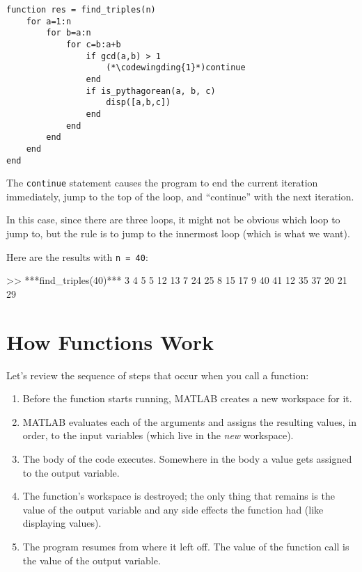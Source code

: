 \begin{lstlisting}[caption={Our final Pythagorean triples function}, label={lst:triples_function}] 
function res = find_triples(n)
    for a=1:n
        for b=a:n
            for c=b:a+b
                if gcd(a,b) > 1
	                (*\codewingding{1}*)continue
                end
                if is_pythagorean(a, b, c)
                    disp([a,b,c])
                end
            end
        end
    end
end
\end{lstlisting}

The \lstinline{continue} statement  causes the program to end the current iteration
immediately, jump to the top of the loop, and ``continue'' with the next iteration.

In this case, since there are three loops, it might not be obvious which loop to jump to, but the rule is to jump to the innermost loop (which is what we want).

Here are the results with \lstinline{n = 40}:

\begin{code}
>> ***find_triples(40)***
     3     4     5
     5    12    13
     7    24    25
     8    15    17
     9    40    41
    12    35    37
    20    21    29
\end{code}


\section{How Functions Work}

Let's review the sequence of steps that occur when you call a function:

\begin{enumerate}

\item Before the function starts running, MATLAB creates a new
workspace for it.

\item MATLAB evaluates each of the arguments and assigns
the resulting values, in order, to the input variables (which
live in the \emph{new} workspace).

\item The body of the code executes.  Somewhere in the body
a value gets assigned to the output variable.

\item The function's workspace is destroyed; the only thing
that remains is the value of the output variable and any side
effects the function had (like displaying values).

\item The program resumes from where it left off.  The value
of the function call is the value of the output variable.

\end{enumerate}

